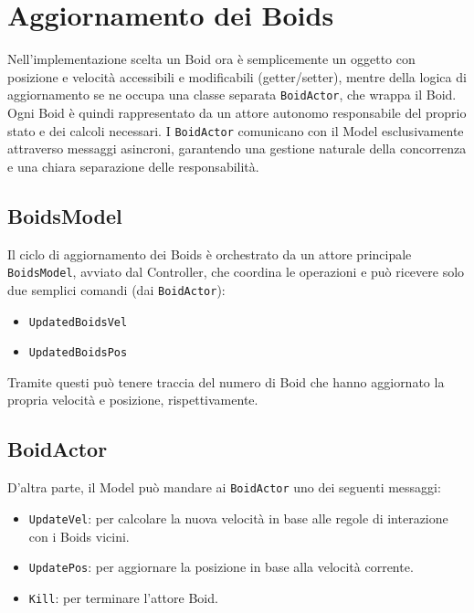 \documentclass[a4paper,12pt]{report}
\begin{document}
    \section{Aggiornamento dei Boids}
        Nell'implementazione scelta un Boid ora è semplicemente un oggetto con posizione e velocità accessibili e modificabili (getter/setter), mentre della logica di aggiornamento se ne occupa una classe separata \texttt{BoidActor}, che wrappa il Boid.
        Ogni Boid è quindi rappresentato da un attore autonomo responsabile del proprio stato e dei calcoli necessari. I \texttt{BoidActor} comunicano con il Model esclusivamente attraverso messaggi asincroni, garantendo una gestione naturale della concorrenza e una chiara separazione delle responsabilità.

        \subsection*{BoidsModel}
            Il ciclo di aggiornamento dei Boids è orchestrato da un attore principale \texttt{BoidsModel}, avviato dal Controller, che coordina le operazioni e può ricevere solo due semplici comandi (dai \texttt{BoidActor}):
            \begin{itemize}
                \item \texttt{UpdatedBoidsVel}
                \item \texttt{UpdatedBoidsPos}
            \end{itemize}
            Tramite questi può tenere traccia del numero di Boid che hanno aggiornato la propria velocità e posizione, rispettivamente.
        
        \subsection*{BoidActor}
            D'altra parte, il Model può mandare ai \texttt{BoidActor} uno dei seguenti messaggi:
            \begin{itemize}
                \item \texttt{UpdateVel}: per calcolare la nuova velocità in base alle regole di interazione con i Boids vicini.
                \item \texttt{UpdatePos}: per aggiornare la posizione in base alla velocità corrente.
                \item \texttt{Kill}: per terminare l'attore Boid.
            \end{itemize}
        
\end{document}

